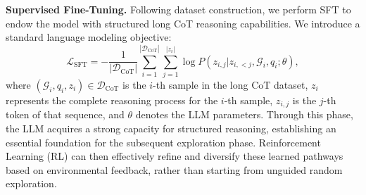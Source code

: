 



\textbf{Supervised Fine-Tuning.}
Following dataset construction, we perform SFT to endow the model with structured long CoT reasoning capabilities. 
We introduce a standard language modeling objective:
\begin{equation}
\mathcal{L}_{\textrm{SFT}} = - \frac{1}{|\mathcal{D}_\textrm{CoT}|} \sum_{i=1}^{|\mathcal{D}_\textrm{CoT}|} \sum_{j=1}^{|z_i|} \log P(z_{i,j} | z_{i,<j}, \mathcal{G}_i, q_i; \theta),
\end{equation}
where $(\mathcal{G}_i, q_i, z_i) \in \mathcal{D}_\textrm{CoT}$ is the $i$-th sample in the long CoT dataset, $z_i$ represents the complete reasoning process for the $i$-th sample, $z_{i,j}$ is the $j$-th token of that sequence, and $\theta$ denotes the LLM parameters. 
Through this phase, the LLM acquires a strong capacity for structured reasoning, establishing an essential foundation for the subsequent exploration phase. Reinforcement Learning (RL) can then effectively refine and diversify these learned pathways based on environmental feedback, rather than starting from unguided random exploration.

